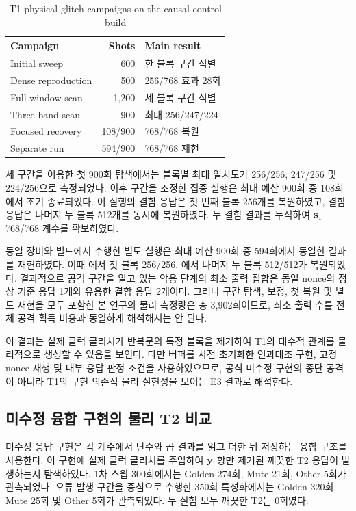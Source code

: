 \begin{table}[H]
\centering
\caption{T1 physical glitch campaigns on the causal-control build}
\label{tab:t1-campaign-result}
\footnotesize
\begin{tabularx}{\columnwidth}{@{}X r X@{}}
\toprule
Campaign & Shots & Main result \\
\midrule
Initial sweep & 600 & 한 블록 구간 식별 \\
Dense reproduction & 500 & 256/768 효과 28회 \\
Full-window scan & 1,200 & 세 블록 구간 식별 \\
Three-band scan & 900 & 최대 256/247/224 \\
Focused recovery & 108/900 & 768/768 복원 \\
Separate run & 594/900 & 768/768 재현 \\
\bottomrule
\end{tabularx}
\end{table}

세 구간을 이용한 첫 900회 탐색에서는 블록별 최대 일치도가
256/256, 247/256 및 224/256으로 측정되었다. 이후 구간을 조정한
집중 실행은 최대 예산 900회 중 108회에서 조기 종료되었다. 이 실행의
 결함 응답은 첫 번째 블록 256개를 복원하였고,
 결함 응답은 나머지 두 블록 512개를 동시에
복원하였다. 두 결함 결과를 누적하여 $\mathbf{s}_1$ 768/768 계수를
확보하였다.

동일 장비와 빌드에서 수행한 별도 실행은 최대 예산 900회 중 594회에서
동일한 결과를 재현하였다. 이때 에서 첫 블록
256/256, 에서 나머지 두 블록 512/512가
복원되었다. 결과적으로 공격 구간을 알고 있는 악용 단계의 최소 출력
집합은 동일 nonce의 정상 기준 응답 1개와 유용한 결함 응답 2개이다.
그러나 구간 탐색, 보정, 첫 복원 및 별도 재현을 모두 포함한 본 연구의
물리 측정량은 총 3,902회이므로, 최소 출력 수를 전체 공격 획득 비용과
동일하게 해석해서는 안 된다.

이 결과는 실제 클럭 글리치가 반복문의 특정 블록을 제거하여 T1의
대수적 관계를 물리적으로 생성할 수 있음을 보인다. 다만 버퍼를
사전 초기화한 인과대조 구현, 고정 nonce 재생 및 내부 응답 판정 조건을
사용하였으므로, 공식 미수정 구현의 종단 공격이 아니라 T1의 구현
의존적 물리 실현성을 보이는 E3 결과로 해석한다.

\subsection{미수정 융합 구현의 물리 T2 비교}
\label{subsec:physical-t2}

미수정 응답 구현은 각 계수에서 난수와 곱 결과를 읽고 더한 뒤 저장하는
융합 구조를 사용한다. 이 구현에 실제 클럭 글리치를 주입하여
$\mathbf{y}$ 항만 제거된 깨끗한 T2 응답이 발생하는지 탐색하였다.
1차 스윕 300회에서는 Golden 274회, Mute 21회, Other 5회가
관측되었다. 오류 발생 구간을 중심으로 수행한 350회 특성화에서는
Golden 320회, Mute 25회 및 Other 5회가 관측되었다. 두 실험 모두
깨끗한 T2는 0회였다.

